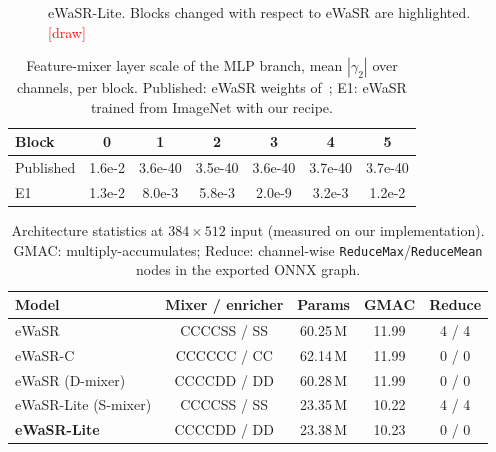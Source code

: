 \documentclass[conference]{IEEEtran}
\newcommand{\tbd}[1]{\textcolor{red}{[#1]}}
\newcommand{\figplaceholder}[2]{\fbox{\parbox[c][#2][c]{0.95\linewidth}{\centering\small\textcolor{red}{#1}}}}
\begin{document}
\begin{figure}[t]
\centering
\figplaceholder{Fig.~1: eWaSR-Lite architecture. ResNet-18 → pyramid pooling (6$\times$8 tokens) → feature mixer CCCCDD, MLP only in block 0 → SIM$\times$4 (+ DD enricher on stride-8 features) → head at H/4. Highlight removed MLPs, S$\to$D, fixed-factor resampling, upsampling on host. Source: docs/design.md.}{4.2cm}
\caption{eWaSR-Lite. Blocks changed with respect to eWaSR are highlighted. \tbd{draw}}
\label{fig:arch}
\end{figure}

\begin{table}[t]
\centering
\caption{Feature-mixer layer scale of the MLP branch, mean $|\gamma_2|$ over channels, per block. Published: eWaSR weights of~\cite{tersek2023ewasr}; E1: eWaSR trained from ImageNet with our recipe.}
\label{tab:gamma}
\setlength{\tabcolsep}{3.5pt}
\begin{tabular}{lcccccc}
\toprule
Block & 0 & 1 & 2 & 3 & 4 & 5 \\
\midrule
Published & 1.6e-2 & 3.6e-40 & 3.5e-40 & 3.6e-40 & 3.7e-40 & 3.7e-40 \\
E1        & 1.3e-2 & 8.0e-3 & 5.8e-3 & 2.0e-9 & 3.2e-3 & 1.2e-2 \\
\bottomrule
\end{tabular}
\end{table}

\begin{table}[t]
\centering
\caption{Architecture statistics at $384\times512$ input (measured on our implementation). GMAC: multiply-accumulates; Reduce: channel-wise \texttt{ReduceMax}/\texttt{ReduceMean} nodes in the exported ONNX graph.}
\label{tab:arch}
\setlength{\tabcolsep}{3pt}
\begin{tabular}{lcccc}
\toprule
Model & Mixer / enricher & Params & GMAC & Reduce \\
\midrule
eWaSR                    & CCCCSS / SS & 60.25\,M & 11.99 & 4 / 4 \\
eWaSR-C                  & CCCCCC / CC & 62.14\,M & 11.99 & 0 / 0 \\
eWaSR (D-mixer)          & CCCCDD / DD & 60.28\,M & 11.99 & 0 / 0 \\
eWaSR-Lite (S-mixer)     & CCCCSS / SS & 23.35\,M & 10.22 & 4 / 4 \\
\textbf{eWaSR-Lite}      & CCCCDD / DD & 23.38\,M & 10.23 & 0 / 0 \\
\bottomrule
\end{tabular}
\end{table}
\end{document}
